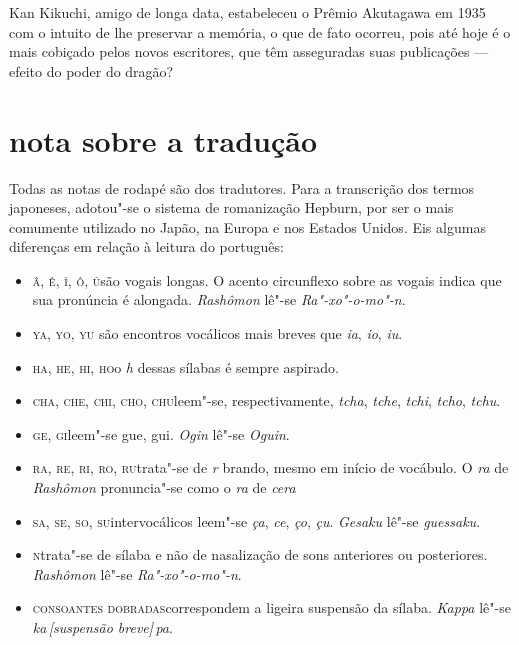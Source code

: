 Kan Kikuchi, amigo de longa data, estabeleceu o Prêmio Akutagawa em
1935 com o intuito de lhe preservar a memória, o que de fato ocorreu,
pois até hoje é o mais cobiçado pelos novos escritores, que têm
asseguradas suas publicações --- efeito do poder do dragão?

\section*{nota sobre a tradução}

Todas as notas de rodapé são dos tradutores.		
Para a transcrição dos termos japoneses, adotou"-se o sistema de
romanização Hepburn, por ser o mais comumente utilizado no Japão, na
Europa e nos Estados Unidos. Eis algumas diferenças em relação à
leitura do português:

\begin{itemize}
\item \textsc{â, ê, î, ô, û}\quad são vogais longas. O acento circunflexo sobre as vogais indica que sua pronúncia é alongada. \textit{Rashômon} lê"-se \textit{Ra"-xo"-o-mo"-n}.

\item \textsc{ya, yo, yu} são encontros vocálicos mais breves que \textit{ia}, \textit{io}, \textit{iu}.

\item \textsc{ha, he, hi, ho}\quad o \textit{h} dessas sílabas é sempre aspirado.

\item \textsc{cha, che, chi, cho, chu}\quad leem"-se, respectivamente, \textit{tcha}, \textit{tche}, \textit{tchi}, \textit{tcho}, \textit{tchu}.

\item \textsc{ge, gi}\quad leem"-se gue, gui. \textit{Ogin} lê"-se \textit{Oguin}.

\item \textsc{ra, re, ri, ro, ru}\quad trata"-se de \textit{r} brando, mesmo em início de vocábulo. O \textit{ra} de \textit{Rashômon} pronuncia"-se como o \textit{ra} de \textit{cera}

\item \textsc{sa, se, so, su}\quad intervocálicos leem"-se \textit{ça}, \textit{ce}, \textit{ço}, \textit{çu}. \textit{Gesaku} lê"-se \textit{guessaku}.

\item \textsc{n}\quad trata"-se de sílaba e não de nasalização de sons anteriores ou posteriores. \textit{Rashômon} lê"-se \textit{Ra"-xo"-o-mo"-n}.

\item \textsc{consoantes dobradas}\quad correspondem a ligeira suspensão da sílaba. \textit{Kappa} lê"-se \textit{ka\,{[}suspensão breve{]}\,pa}.
\end{itemize}